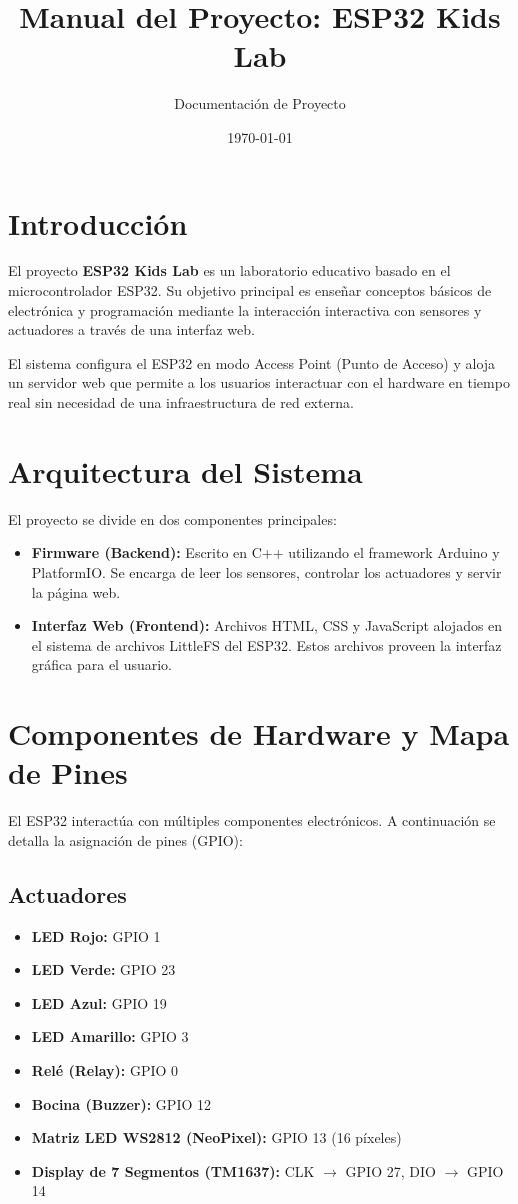 \documentclass[12pt,a4paper]{article}
\title{Manual del Proyecto: ESP32 Kids Lab}
\author{Documentación de Proyecto}
\date{\today}
\begin{document}
\maketitle
\tableofcontents
\newpage

\section{Introducción}
El proyecto \textbf{ESP32 Kids Lab} es un laboratorio educativo basado en el microcontrolador ESP32. Su objetivo principal es enseñar conceptos básicos de electrónica y programación mediante la interacción interactiva con sensores y actuadores a través de una interfaz web.

El sistema configura el ESP32 en modo Access Point (Punto de Acceso) y aloja un servidor web que permite a los usuarios interactuar con el hardware en tiempo real sin necesidad de una infraestructura de red externa.

\section{Arquitectura del Sistema}
El proyecto se divide en dos componentes principales:
\begin{itemize}
    \item \textbf{Firmware (Backend):} Escrito en C++ utilizando el framework Arduino y PlatformIO. Se encarga de leer los sensores, controlar los actuadores y servir la página web.
    \item \textbf{Interfaz Web (Frontend):} Archivos HTML, CSS y JavaScript alojados en el sistema de archivos LittleFS del ESP32. Estos archivos proveen la interfaz gráfica para el usuario.
\end{itemize}

\section{Componentes de Hardware y Mapa de Pines}
El ESP32 interactúa con múltiples componentes electrónicos. A continuación se detalla la asignación de pines (GPIO):

\subsection{Actuadores}
\begin{itemize}
    \item \textbf{LED Rojo:} GPIO 1
    \item \textbf{LED Verde:} GPIO 23
    \item \textbf{LED Azul:} GPIO 19
    \item \textbf{LED Amarillo:} GPIO 3
    \item \textbf{Relé (Relay):} GPIO 0
    \item \textbf{Bocina (Buzzer):} GPIO 12
    \item \textbf{Matriz LED WS2812 (NeoPixel):} GPIO 13 (16 píxeles)
    \item \textbf{Display de 7 Segmentos (TM1637):} CLK $\rightarrow$ GPIO 27, DIO $\rightarrow$ GPIO 14
\end{itemize}
\end{document}
